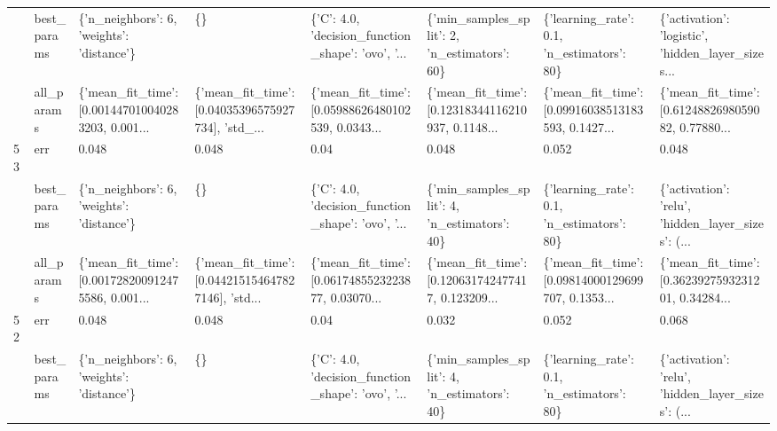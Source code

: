 \begin{tabular}{llllllll}
   & best\_params &          \{'n\_neighbors': 6, 'weights': 'distance'\} &                                                 \{\} &  \{'C': 4.0, 'decision\_function\_shape': 'ovo', '... &       \{'min\_samples\_split': 2, 'n\_estimators': 60\} &         \{'learning\_rate': 0.1, 'n\_estimators': 80\} &  \{'activation': 'logistic', 'hidden\_layer\_sizes... \\
   & all\_params &  \{'mean\_fit\_time': [0.001447010040283203, 0.001... &  \{'mean\_fit\_time': [0.04035396575927734], 'std\_... &  \{'mean\_fit\_time': [0.05988626480102539, 0.0343... &  \{'mean\_fit\_time': [0.12318344116210937, 0.1148... &  \{'mean\_fit\_time': [0.09916038513183593, 0.1427... &  \{'mean\_fit\_time': [0.6124882698059082, 0.77880... \\
53 & err &                                              0.048 &                                              0.048 &                                               0.04 &                                              0.048 &                                              0.052 &                                              0.048 \\
   & best\_params &          \{'n\_neighbors': 6, 'weights': 'distance'\} &                                                 \{\} &  \{'C': 4.0, 'decision\_function\_shape': 'ovo', '... &       \{'min\_samples\_split': 4, 'n\_estimators': 40\} &         \{'learning\_rate': 0.1, 'n\_estimators': 80\} &  \{'activation': 'relu', 'hidden\_layer\_sizes': (... \\
   & all\_params &  \{'mean\_fit\_time': [0.001728200912475586, 0.001... &  \{'mean\_fit\_time': [0.044215154647827146], 'std... &  \{'mean\_fit\_time': [0.0617485523223877, 0.03070... &  \{'mean\_fit\_time': [0.120631742477417, 0.123209... &  \{'mean\_fit\_time': [0.09814000129699707, 0.1353... &  \{'mean\_fit\_time': [0.3623927593231201, 0.34284... \\
52 & err &                                              0.048 &                                              0.048 &                                               0.04 &                                              0.032 &                                              0.052 &                                              0.068 \\
   & best\_params &          \{'n\_neighbors': 6, 'weights': 'distance'\} &                                                 \{\} &  \{'C': 4.0, 'decision\_function\_shape': 'ovo', '... &       \{'min\_samples\_split': 4, 'n\_estimators': 40\} &         \{'learning\_rate': 0.1, 'n\_estimators': 80\} &  \{'activation': 'relu', 'hidden\_layer\_sizes': (... \\

\end{tabular}

